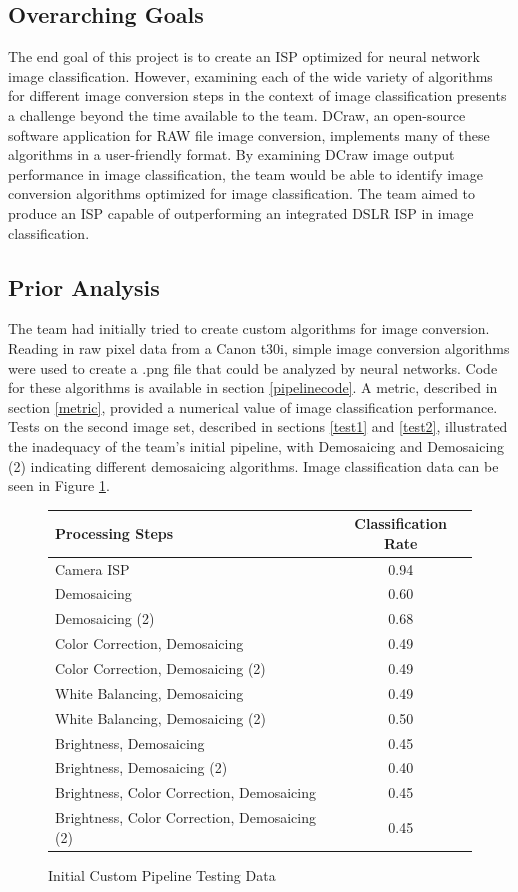 \documentclass{report}
\begin{document}
\subsection{Overarching Goals}
The end goal of this project is to create an ISP optimized for neural network image classification. However, examining each of the wide variety of algorithms for different image conversion steps in the context of image classification presents a challenge beyond the time available to the team. DCraw, an open-source software application for RAW file image conversion, implements many of these algorithms in a user-friendly format. By examining DCraw image output performance in image classification, the team would be able to identify image conversion algorithms optimized for image classification. The team aimed to produce an ISP capable of outperforming an integrated DSLR ISP in image classification.

\subsection{Prior Analysis}
The team had initially tried to create custom algorithms for image conversion. Reading in raw pixel data from a Canon t30i, simple image conversion algorithms were used to create a .png file that could be analyzed by neural networks. Code for these algorithms is available in section \ref{pipelinecode}. A metric, described in section \ref{metric}, provided a numerical value of image classification performance. Tests on the second image set, described in sections \ref{test1} and \ref{test2}, illustrated the inadequacy of the team's initial pipeline, with Demosaicing and Demosaicing (2) indicating different demosaicing algorithms. Image classification data can be seen in Figure \ref{inittests}.

\begin{figure}[!htb]
\label{inittests}
\caption{Initial Custom Pipeline Testing Data}
\begin{tabular}{lc}
	Processing Steps & Classification Rate \\
	\hline
	Camera ISP & 0.94 \\
	Demosaicing & 0.60 \\
	Demosaicing (2) & 0.68 \\
	Color Correction, Demosaicing & 0.49 \\
	Color Correction, Demosaicing (2) & 0.49 \\
	White Balancing, Demosaicing & 0.49 \\
	White Balancing, Demosaicing (2) & 0.50 \\
	Brightness, Demosaicing & 0.45 \\
	Brightness, Demosaicing (2) & 0.40 \\
	Brightness, Color Correction, Demosaicing & 0.45 \\
	Brightness, Color Correction, Demosaicing (2) & 0.45 \\
\end{tabular}
\end{figure}
\end{document}
